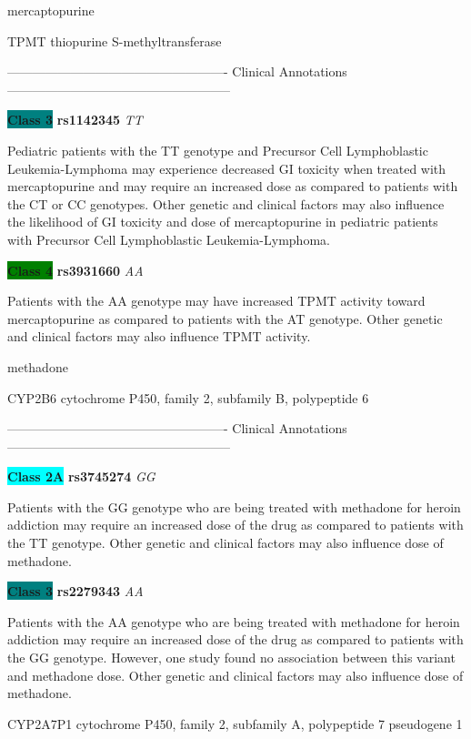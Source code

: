\documentclass{resume} %
\begin{document}
\begin{rSection}{ mercaptopurine }
\begin{rSubsection}{ TPMT }{ thiopurine S-methyltransferase }{}{}
\item[] ---------------------------------------------------- Clinical Annotations -----------------------------------------------------\newline
\item \textbf{\colorbox{teal} {Class 3}} \textbf{ rs1142345 } \textit{ TT }
\item[] Pediatric patients with the TT genotype and Precursor Cell Lymphoblastic Leukemia-Lymphoma may experience decreased GI toxicity when treated with mercaptopurine and may require an increased dose as compared to patients with the CT or CC genotypes. Other genetic and clinical factors may also influence the likelihood of GI toxicity and dose of mercaptopurine in pediatric patients with Precursor Cell Lymphoblastic Leukemia-Lymphoma.\item \textbf{\colorbox{green} {Class 4}} \textbf{ rs3931660 } \textit{ AA }
\item[] Patients with the AA genotype may have increased TPMT activity toward mercaptopurine as compared to patients with the AT genotype. Other genetic and clinical factors may also influence TPMT activity. 
\end{rSubsection}

\end{rSection}\begin{rSection}{ methadone }
\item[]

\begin{rSubsection}{ CYP2B6 }{ cytochrome P450, family 2, subfamily B, polypeptide 6 }{}{}
\item[]

\item[] ---------------------------------------------------- Clinical Annotations -----------------------------------------------------\newline
\item \textbf{\colorbox{cyan} {Class 2A}} \textbf{ rs3745274 } \textit{ GG }
\item[] Patients with the GG genotype who are being treated with methadone for heroin addiction may require an increased dose of the drug as compared to patients with the TT genotype. Other genetic and clinical factors may also influence dose of methadone.\item \textbf{\colorbox{teal} {Class 3}} \textbf{ rs2279343 } \textit{ AA }
\item[] Patients with the AA genotype who are being treated with methadone for heroin addiction may require an increased dose of the drug as compared to patients with the GG genotype. However, one study found no association between this variant and methadone dose. Other genetic and clinical factors may also influence dose of methadone.
\end{rSubsection}\begin{rSubsection}{ CYP2A7P1 }{ cytochrome P450, family 2, subfamily A, polypeptide 7 pseudogene 1 }{}{}
\item[]


\end{rSubsection}
\end{rSection}
\end{document}
